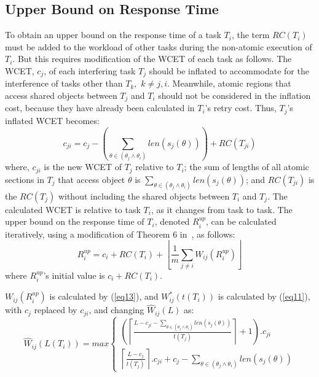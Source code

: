 \documentclass{sig-alternate}
\begin{document}
\subsection{Upper Bound on Response Time}

To obtain an upper bound on the response time of a task $T_{i}$, the term $RC(T_{i})$ must be added to the workload of other tasks during the non-atomic
execution of $T_{i}$. But this requires modification of the WCET of each
task as follows. 
The WCET, $c_{j}$, of each interfering task $T_{j}$ should be inflated to accommodate for the interference of tasks other than $T_{k},$ $k\ne j,i$. Meanwhile, atomic regions that access shared objects between $T_{j}$ and $T_{i}$ should not be considered in the inflation cost, because they have already been calculated in $T_{i}$'s retry cost. Thus, $T_{j}$'s inflated WCET becomes:
\begin{equation}
c_{ji}=c_{j}-\left(\sum_{\theta\in(\theta_{j}\wedge\theta_{i})}len \left(s_{j}(\theta) \right) \right)+RC(T_{ji})\label{eq9}\end{equation}
where, $c_{ji}$ is the new WCET of $T_{j}$ relative to $T_{i}$; 
the sum of lengths of all atomic sections in $T_{j}$ that access object $\theta$ is $\sum_{\theta \in (\theta_j \wedge \theta_i)} {len(s_{j}(\theta))}$; and $RC(T_{ji})$ is the $RC(T_j)$ 
 without including the shared objects between $T_{i}$ and $T_{j}$.
The calculated WCET is relative to task $T_{i}$, as it changes from task to task. The upper bound on the response time of $T_{i}$, denoted $R_{i}^{up}$, can be calculated iteratively, using a modification of Theorem 6 in~\cite{key-2}, as follows:
\begin{equation}
R_{i}^{up}=c_{i}+RC(T_{i})+\left\lfloor\frac{1}{m}\sum_{j\ne i}W_{ij}(R_{i}^{up})\right\rfloor
\label{eq10}
\end{equation}
where $R_{i}^{up}$'s initial value is $c_{i}+RC(T_{i})$.

$W_{ij}(R_{i}^{up})$ is calculated by (\ref{eq13}), and $W_{ij}^{*}(t(T_{i}))$
is calculated by (\ref{eq11}), with $c_{j}$ replaced by 
$c_{ji}$, and changing $\hat{W}_{ij}(L)$ as:
\begin{equation}
\hat{W}_{ij}(L(T_{i}))=max\begin{cases}
\left(\left\lceil\frac{L-c_{ji}-\sum_{\theta\in(\theta_{j}\wedge\theta_{i})}len(s_{j}(\theta))}{t(T_{j})}\right\rceil+1 \right).c_{ji}\\
\left\lceil\frac{L-c_{j}}{t(T_{j})}\right\rceil.c_{ji}+c_{j}-\sum_{\theta\in(\theta_{j}\wedge\theta_{i})}len(s_{j}(\theta))\end{cases}\label{eq14}\end{equation}
\end{document}
